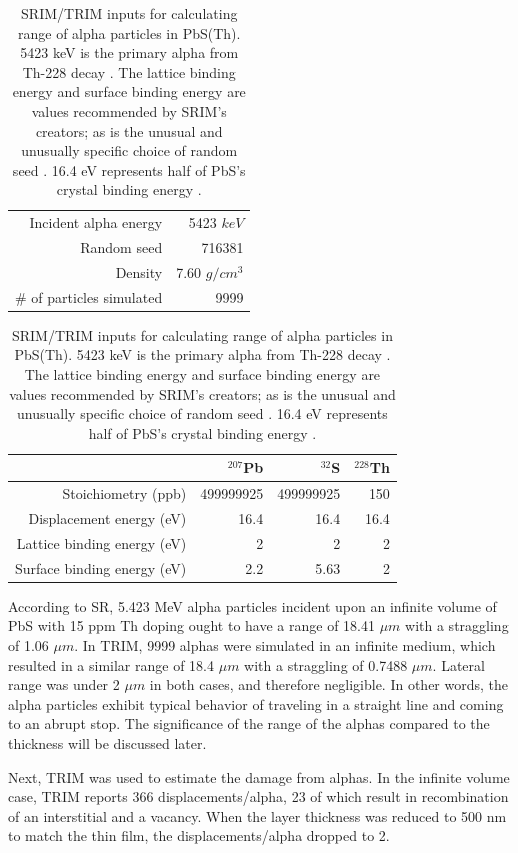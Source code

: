 \begin{table}[thb]
\begin{center}
\begin{tabular}{|r|r|}\hline
Incident alpha energy	&	5423 $keV$\\
Random seed			&	716381\\
Density				&	7.60 $g/cm^3$ \cite{CRC}\\
\# of particles simulated	&	9999\\\hline
\end{tabular}
\begin{tabular}{|r|r|r|r|}\hline
					&	$^{207}$Pb	&	$^{32}$S		&	$^{228}$Th\\\hline
Stoichiometry (ppb)		&	499999925	&	499999925	&	150		\\\hline
Displacement energy (eV)&	16.4			&	16.4			&	16.4 		\\\hline
Lattice binding energy (eV)&	2			&	2			&	2 		\\\hline
Surface binding energy (eV)&	2.2			&	5.63			&	2 		\\\hline
\end{tabular}
\end{center}
\caption{SRIM/TRIM inputs for calculating range of alpha particles in PbS(Th). 5423 keV is the primary alpha from Th-228 decay \cite{NNDC}. The lattice binding energy and surface binding energy are values recommended by SRIM's creators; as is the unusual and unusually specific choice of random seed \cite{srim_textbook}. 16.4 eV represents half of PbS's crystal binding energy \cite{Tanaka1979}.\label{trim_inputs}}
\end{table}%

According to SR, 5.423 MeV alpha particles incident upon an infinite volume of PbS with 15 ppm Th doping ought to have a range of 18.41 $\mu m$ with a straggling of 1.06 $\mu m$. In TRIM, 9999 alphas were simulated in an infinite medium, which resulted in a similar range of 18.4 $\mu m$ with a straggling of 0.7488 $\mu m$. Lateral range was under 2 $\mu m$ in both cases, and therefore negligible. In other words, the alpha particles exhibit typical behavior of traveling in a straight line and coming to an abrupt stop. The significance of the range of the alphas compared to the thickness will be discussed later.

Next, TRIM was used to estimate the damage from alphas. In the infinite volume case, TRIM reports 366 displacements/alpha, 23 of which result in recombination of an interstitial and a vacancy. When the layer thickness was reduced to 500 nm to match the thin film, the displacements/alpha dropped to 2.


